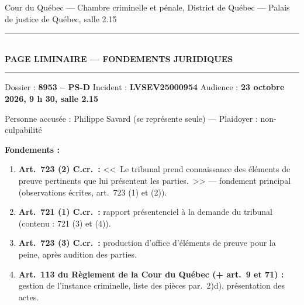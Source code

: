 \documentclass[12pt,letterpaper,oneside]{article}
\begin{document}
\thispagestyle{empty}
\onehalfspacing
\begin{center}
Cour du Qu\'ebec --- Chambre criminelle et p\'enale, District de Qu\'ebec --- Palais de justice de Qu\'ebec, salle 2.15\par
\vspace{0.2cm}
\rule{\textwidth}{0.4pt}\\[0.3em]
{\normalsize\bfseries PAGE LIMINAIRE --- FONDEMENTS JURIDIQUES}\\[0.3em]
\rule{\textwidth}{0.4pt}
\end{center}
\begin{center}
Dossier : \textbf{8953 -- PS-D} \quad Incident : \textbf{LVSEV25000954} \quad Audience : \textbf{23 octobre 2026, 9 h 30, salle 2.15}\par
Personne accus\'ee : Philippe Savard (se repr\'esente seule) --- Plaidoyer : non-culpabilit\'e\par
\end{center}
\vspace{0.2cm}
\noindent{}
\vspace{0.3cm}
\noindent\textbf{Fondements :}
\begin{enumerate}[label=\arabic*.,leftmargin=*,itemsep=2pt,topsep=2pt,parsep=2pt]
\item \textbf{Art.\ 723 (2) C.cr.\ :} <<~Le tribunal prend connaissance des \'el\'ements de preuve pertinents que lui pr\'esentent les parties.~>> --- fondement principal (observations \'ecrites, art.\ 723 (1) et (2)).
\item \textbf{Art.\ 721 (1) C.cr.\ :} rapport pr\'esentenciel \`a la demande du tribunal (contenu : 721 (3) et (4)).
\item \textbf{Art.\ 723 (3) C.cr.\ :} production d'office d'\'el\'ements de preuve pour la peine, apr\`es audition des parties.
\item \textbf{Art.\ 113 du R\`eglement de la Cour du Qu\'ebec (+ art.\ 9 et 71) :} gestion de l'instance criminelle, liste des pi\`eces par.\ 2)d), pr\'esentation des actes.
\end{enumerate}
\newpage
\end{document}

